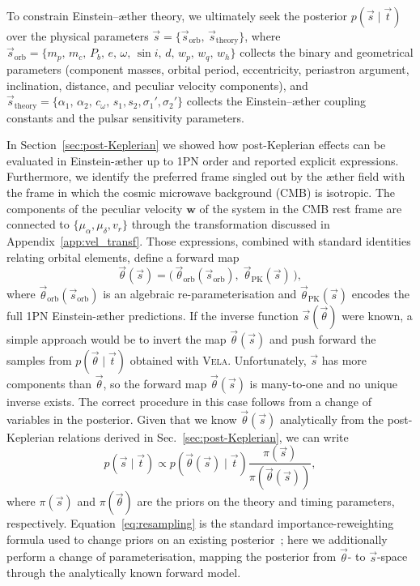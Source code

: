 \documentclass[
    floats,
    floatfix,
    amssymb,
    prd,
    twocolumn,
    superscriptaddress,
    nofootinbib,
    unicode,
    colorlinks=true,
    linktocpage=true
]{revtex4-2}
\begin{document}
To constrain Einstein--\ae ther theory, we ultimately seek the posterior 
$p(\vec{s}\mid\vec{t})$ over the physical parameters 
$\vec{s} = \{\vec{s}_\mathrm{orb},\,\vec{s}_\mathrm{theory}\}$, where 
$\vec{s}_\mathrm{orb} = \{m_p,\, m_c,\, P_b,\, e,\, \omega,\, \sin i,\, d,\, w_p,\, w_q,\, w_h\}$ 
collects the binary and geometrical parameters (component masses, orbital period, 
eccentricity, periastron argument, inclination, distance, and peculiar velocity 
components), and $\vec{s}_\mathrm{theory} = \{\alpha_1,\, \alpha_2,\, c_\omega,\, s_1, s_2, \sigma_1', \sigma_2'\}$ 
collects the Einstein--\ae ther coupling constants and the pulsar sensitivity 
parameters.

In Section~\ref{sec:post-Keplerian} we showed how post-Keplerian effects
can be evaluated in Einstein-\ae ther up to 1PN order and reported explicit
expressions. Furthermore, we identify the preferred frame singled out by the \ae ther field with the frame 
in which the cosmic microwave background (CMB) is isotropic. The components of the peculiar velocity $\bm{w}$ of the system in the CMB rest frame are  connected to $\{\mu_\alpha,\mu_\delta, v_r\}$ through the transformation discussed in Appendix~\ref{app:vel_transf}. 
Those expressions, combined with standard identities relating
orbital elements, define a forward map
\begin{equation}
    \vec{\theta}(\vec{s}) = \bigl(\,\vec{\theta}_\mathrm{orb}(\vec{s}_\mathrm{orb}),\;
    \vec{\theta}_\mathrm{PK}(\vec{s})\,\bigr),
\end{equation}
where $\vec{\theta}_\mathrm{orb}(\vec{s}_\mathrm{orb})$ is an algebraic
re-parameterisation and $\vec{\theta}_\mathrm{PK}(\vec{s})$ encodes the
full 1PN Einstein-\ae ther predictions. If the inverse function $\vec{s}(\vec{\theta})$ were known, a simple approach would be to invert the map $\vec{\theta}(\vec{s})$ and
push forward the samples from $p(\vec{\theta}\mid\vec{t})$ obtained with \textsc{Vela}. Unfortunately, $\vec{s}$ has more components than
$\vec{\theta}$, so the forward map $\vec{\theta}(\vec{s})$ is many-to-one
and no unique inverse exists. The correct procedure in this case follows from a change of variables in the posterior.
Given that we know $\vec{\theta}(\vec{s})$ analytically from the
post-Keplerian relations derived in Sec.~\ref{sec:post-Keplerian}, we can
write
\begin{equation}
    p(\vec{s}\mid\vec{t})
    \propto
    p\!\left(\vec{\theta}(\vec{s})\mid\vec{t}\right)
    \frac{\pi(\vec{s})}{\pi\!\left(\vec{\theta}(\vec{s})\right)},
\label{eq:resampling}
\end{equation}
where $\pi(\vec{s})$ and $\pi(\vec{\theta})$ are the priors on the theory
and timing parameters, respectively. Equation~\eqref{eq:resampling} is
the standard importance-reweighting formula used to change priors on an
existing posterior~\cite{Smith1992BayesianSW}; here we additionally perform
a change of parameterisation, mapping the posterior from $\vec{\theta}$-
to $\vec{s}$-space through the analytically known forward model.
\end{document}
